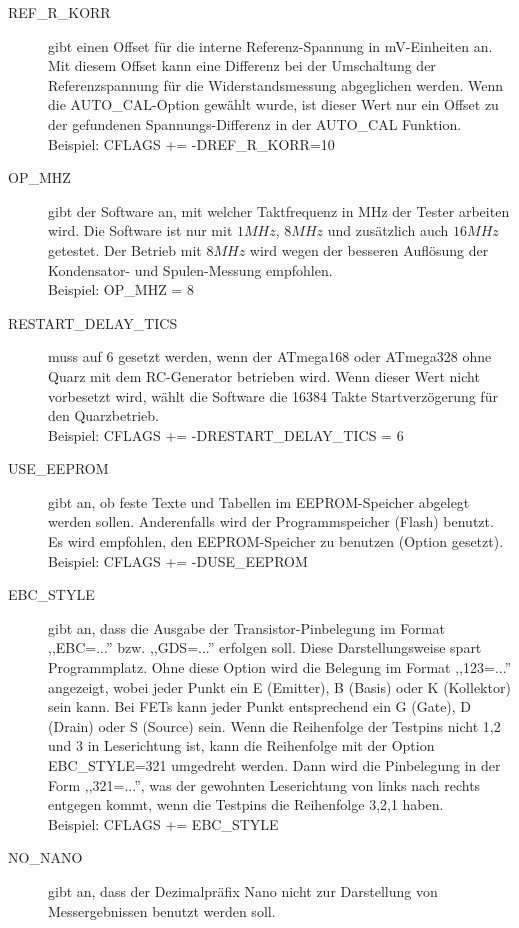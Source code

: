 \begin{description}
  \item[REF\_R\_KORR] gibt einen Offset für die interne Referenz-Spannung in mV-Einheiten an.
Mit diesem Offset kann eine Differenz bei der Umschaltung der Referenzspannung für die Widerstandsmessung abgeglichen werden.
Wenn die AUTO\_CAL-Option gewählt wurde, ist dieser Wert nur ein Offset zu der gefundenen Spannungs-Differenz in der
AUTO\_CAL Funktion.\\
Beispiel: CFLAGS += -DREF\_R\_KORR=10
  \item[OP\_MHZ] gibt der Software an, mit welcher Taktfrequenz in MHz der Tester arbeiten wird.
Die Software ist nur mit \(1MHz\), \(8MHz\) und zusätzlich auch \(16MHz\) getestet. Der Betrieb mit \(8MHz\) wird wegen der besseren Auflösung der
Kondensator- und Spulen-Messung empfohlen.\\
Beispiel: OP\_MHZ = 8
  \item[RESTART\_DELAY\_TICS] muss auf 6 gesetzt werden, wenn der ATmega168 oder ATmega328 ohne Quarz mit dem
RC-Generator betrieben wird. Wenn dieser Wert nicht vorbesetzt wird, wählt die Software die 16384 Takte Startverzögerung für
den Quarzbetrieb.\\
Beispiel: CFLAGS += -DRESTART\_DELAY\_TICS = 6
  \item[USE\_EEPROM] gibt an, ob feste Texte und Tabellen im EEPROM-Speicher abgelegt werden sollen.
Anderenfalls wird der Programmspeicher (Flash) benutzt.
Es wird empfohlen, den EEPROM-Speicher zu benutzen (Option gesetzt).\\
Beispiel: CFLAGS += -DUSE\_EEPROM
  \item[EBC\_STYLE] gibt an, dass die Ausgabe der Transistor-Pinbelegung im Format ,,EBC=...'' bzw. ,,GDS=...'' erfolgen soll.
Diese Darstellungsweise spart Programmplatz. Ohne diese Option wird die Belegung im Format ,,123=...'' angezeigt, wobei
jeder Punkt ein E (Emitter), B (Basis) oder K (Kollektor) sein kann.
Bei FETs kann jeder Punkt entsprechend ein G (Gate), D (Drain) oder S (Source) sein.
Wenn die Reihenfolge der Testpins nicht 1,2 und 3 in Leserichtung ist, kann die Reihenfolge mit der Option EBC\_STYLE=321 
umgedreht werden. Dann wird die Pinbelegung in der Form ,,321=...'', was der gewohnten Leserichtung von links nach rechts
entgegen kommt, wenn die Testpins die Reihenfolge 3,2,1 haben.\\
Beispiel: CFLAGS += EBC\_STYLE
  \item[NO\_NANO] gibt an, dass der Dezimalpräfix Nano nicht zur Darstellung von Messergebnissen benutzt werden soll.

\end{description}
